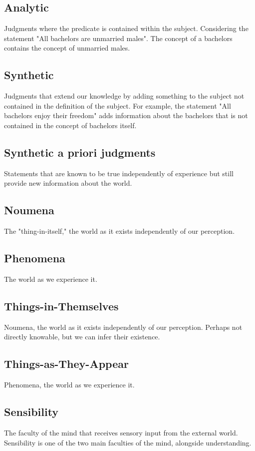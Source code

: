 \documentclass[a4paper]{article}
\begin{document}
\subsection{Analytic}
Judgments where the predicate is contained within the subject. 
Considering the statement "All bachelors are unmarried males".
The concept of a bachelors contains the concept of unmarried males. 

\subsection{Synthetic}
Judgments that extend our knowledge by adding something to the subject not contained in the definition of the subject.
For example, the statement "All bachelors enjoy their freedom" adds information about the bachelors that is not contained in the concept of bachelors itself.

\subsection{Synthetic a priori judgments}
Statements that are known to be true independently of experience but still provide new information about the world.

\subsection{Noumena}
The "thing-in-itself," the world as it exists independently of our perception.

\subsection{Phenomena}
The world as we experience it. 

\subsection{Things-in-Themselves}
Noumena, the world as it exists independently of our perception.
Perhaps not directly knowable, but we can infer their existence.

\subsection{Things-as-They-Appear}
Phenomena, the world as we experience it.

\subsection{Sensibility}
The faculty of the mind that receives sensory input from the external world.
Sensibility is one of the two main faculties of the mind, alongside understanding.
\end{document}

